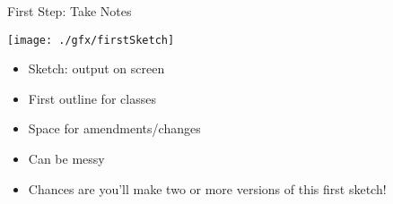 \begin{frame}{First Step: Take Notes}
%
\begin{center}
	\begin{minipage}{.6\linewidth}
	\texttt{[image: ./gfx/firstSketch]}
	\end{minipage}
	\hspace{1em}
	\begin{minipage}{.35\linewidth}
		\begin{itemize}
		\item Sketch: output on screen
		\item First outline for classes
		\item Space for amendments/changes
		\item Can be messy
		\item Chances are you'll make two or more versions of this first sketch!
		\end{itemize}
	\end{minipage}
\end{center}
%
\end{frame}


